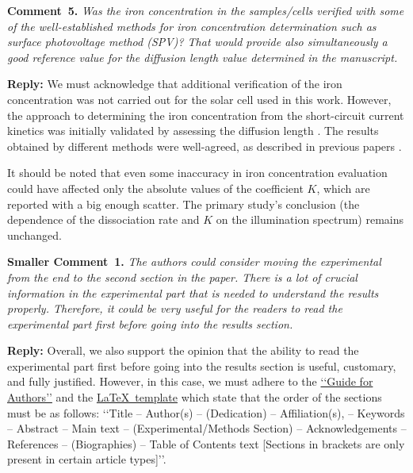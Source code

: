 \documentclass{WileyMSP-template}
\begin{document}
\vspace{1cm}
\noindent
\textcolor[rgb]{0.00,0.50,1.00}{\textbf{Comment~5.}}
\emph{
Was the iron concentration in the samples/cells verified with some of the well-established methods
for iron concentration determination such as surface photovoltage method (SPV)?
That would provide also simultaneously a good reference value for the diffusion length value determined in the manuscript.
}

\noindent
\textcolor[rgb]{0.51,0.00,0.00}{\textbf{Reply:}}
We must acknowledge that additional verification of the iron concentration was not carried out for the solar cell used in this work.
However, the approach to determining the iron concentration from the short-circuit current kinetics
was initially validated by assessing the diffusion length \cite{FeB_Zong}.
The results obtained by different methods were well-agreed, as described in previous papers \cite{Olikh2021JAP,Olikh2022:JMatSci}.

It should be noted that even some inaccuracy in iron concentration evaluation could have affected only
the absolute values of the coefficient $K$, which are reported \cite{FeBLight2,FeBAssJAP2014,FeBKin2019} with a big enough scatter.
The primary study's conclusion (the dependence of the dissociation rate and $K$ on the illumination spectrum) remains unchanged.




\vspace{1cm}
\noindent
\textcolor[rgb]{0.00,0.50,1.00}{\textbf{Smaller Comment~1.}}
\emph{The authors could consider moving the experimental from the end to the second section in the paper.
There is a lot of crucial information in the experimental part that is needed to understand the results properly.
Therefore, it could be very useful for the readers to read the experimental part first before going into the results section.}

\noindent
\textcolor[rgb]{0.51,0.00,0.00}{\textbf{Reply:}}
Overall, we also support the opinion that the ability to read the experimental part first
before going into the results section is useful, customary, and fully justified.
However, in this case, we must adhere to the
\href{https://onlinelibrary.wiley.com/page/journal/18626319/homepage/author-guidelines}{‘‘Guide for Authors’’}
and the
\href{https://onlinelibrary.wiley.com/pb-assets/assets/vch/msp/LaTeX-template-1593698612150.zip}{\LaTeX~template}
which state that the order of the sections must be as follows:
‘‘Title -- Author(s) -- (Dedication) -- Affiliation(s), -- Keywords --
Abstract -- Main text -- (Experimental/Methods Section) -- Acknowledgements -- References -- (Biographies) -- Table of Contents text
 [Sections in brackets are only present in certain article types]’’.
\end{document}
